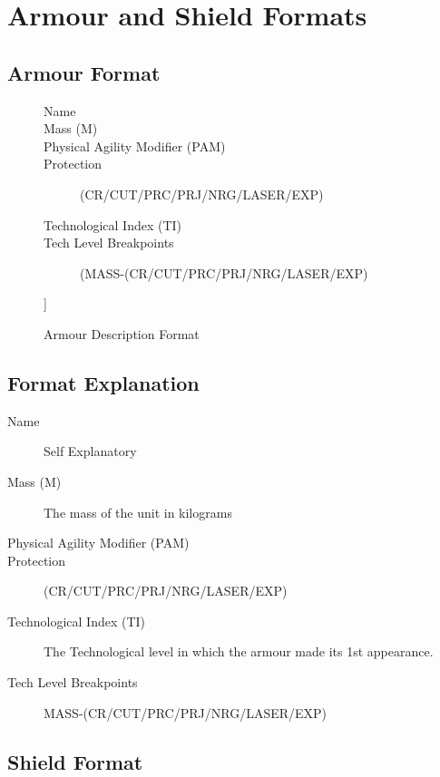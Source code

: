 \chapter{Armour and Shield Formats}

\section{Armour Format}

\begin{figure}[hb]
\centering
\caption{Armour Description Format}
	\begin{description}
		\item[Name]
		\item[Mass (M)]
		\item[Physical Agility Modifier (PAM)]
		\item[Protection]
		(CR/CUT/PRC/PRJ/NRG/LASER/EXP)
		\item[Technological Index (TI)]
		\item[Tech Level Breakpoints]
		(MASS-(CR/CUT/PRC/PRJ/NRG/LASER/EXP)
	\end{description}]
\end{figure}

\section{Format Explanation}

\begin{description}
	\item[Name]
	Self Explanatory
	\item[Mass (M)]
	The mass of the unit in kilograms
	\item[Physical Agility Modifier (PAM)]
	\item[Protection]
	(CR/CUT/PRC/PRJ/NRG/LASER/EXP)
	\item[Technological Index (TI)]
	The Technological level in which the armour made its 1st appearance.
	\item[Tech Level Breakpoints]
	MASS-(CR/CUT/PRC/PRJ/NRG/LASER/EXP)
\end{description}

\clearpage

\section{Shield Format}

